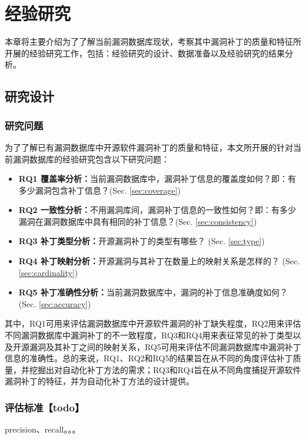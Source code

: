 \chapter{经验研究}

本章将主要介绍为了了解当前漏洞数据库现状，考察其中漏洞补丁的质量和特征所开展的经验研究工作，包括：经验研究的设计、数据准备以及经验研究的结果分析。


\section{研究设计}
\subsection{研究问题}
为了了解已有漏洞数据库中开源软件漏洞补丁的质量和特征，本文所开展的针对当前漏洞数据库的经验研究包含以下研究问题：

\begin{itemize}[leftmargin=*]
    \item \textbf{RQ1 覆盖率分析：}当前漏洞数据库中，漏洞补丁信息的覆盖度如何？即：有多少漏洞包含补丁信息？(Sec. \ref{sec:coverage})
    \item \textbf{RQ2 一致性分析：}不用漏洞库间，漏洞补丁信息的一致性如何？即：有多少漏洞在漏洞数据库中具有相同的补丁信息？(Sec. \ref{sec:consistency})
    \item \textbf{RQ3 补丁类型分析：}开源漏洞补丁的类型有哪些？ (Sec. \ref{sec:type})
    \item \textbf{RQ4 补丁映射分析：}开源漏洞与其补丁在数量上的映射关系是怎样的？ (Sec. \ref{sec:cardinality})
    \item \textbf{RQ5 补丁准确性分析：}当前漏洞数据库中，漏洞的补丁信息准确度如何？ (Sec. \ref{sec:accuracy})
\end{itemize}
    
其中，RQ1可用来评估漏洞数据库中开源软件漏洞的补丁缺失程度，RQ2用来评估不同漏洞数据库中漏洞补丁的不一致程度，RQ3和RQ4用来表征常见的补丁类型以及开源漏洞及其补丁之间的映射关系，RQ5可用来评估不同漏洞数据库中漏洞补丁信息的准确性。总的来说，RQ1、RQ2和RQ5的结果旨在从不同的角度评估补丁质量，并挖掘出对自动化补丁方法的需求；RQ3和RQ4旨在从不同角度捕捉开源软件漏洞补丁的特征，并为自动化补丁方法的设计提供。

\subsection{评估标准【todo】}
precision、recall。。。

